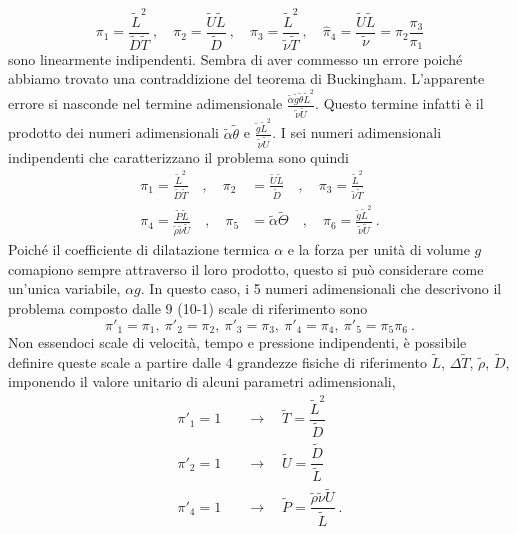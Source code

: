 \documentclass{article}
\begin{document}
\begin{equation}
    \pi_1 = \frac{\tilde{L}^2}{\tilde{D}\tilde{T}} \ , \quad
    \pi_2 = \frac{\tilde{U}\tilde{L}}{\tilde{D}} \ , \quad
    \pi_3 = \frac{\tilde{L}^2}{\tilde{\nu}\tilde{T}} \ , \quad 
    \hat{\pi}_4 = \frac{\tilde{U}\tilde{L}}{\tilde{\nu}} = \pi_2 \dfrac{\pi_3}{\pi_1}
\end{equation}
sono linearmente indipendenti. Sembra di aver commesso un errore poiché abbiamo trovato una contraddizione del teorema di Buckingham. L'apparente errore si nasconde nel termine adimensionale $\frac{\tilde{\alpha} \tilde{g} \tilde{\theta} \tilde{L}^2}{\tilde{\nu} \tilde{U}}$. Questo termine infatti è il prodotto dei numeri adimensionali $\tilde{\alpha} \tilde{\theta}$ e $\frac{\tilde{g} \tilde{L}^2}{\tilde{\nu} \tilde{U}}$.
I sei numeri adimensionali indipendenti che caratterizzano il problema sono quindi
\begin{equation}
\begin{aligned}
    \pi_1 = \frac{\tilde{L}^2}{\tilde{D}\tilde{T}} \quad ,\quad
    \pi_2 & = \frac{\tilde{U}\tilde{L}}{\tilde{D}} \quad ,\quad
    \pi_3 = \frac{\tilde{L}^2}{\tilde{\nu}\tilde{T}} \\
    \pi_4 = \frac{\tilde{P}\tilde{L}}{\tilde{\rho}\tilde{\nu}\tilde{U}} \quad ,\quad
    \pi_5 & = {\tilde{\alpha}\tilde{\Theta}} \quad ,\quad
    \pi_6 = \frac{\tilde{g} \tilde{L}^2}{\tilde{\nu} \tilde{U}} \ .
\end{aligned}
\end{equation}
%
Poiché il coefficiente di dilatazione termica $\alpha$ e la forza per unità di volume $g$ comapiono sempre attraverso il loro prodotto, questo si può considerare come un'unica variabile, $\alpha g$. In questo caso, i 5 numeri adimensionali che descrivono il problema composto dalle 9 (10-1) scale di riferimento sono
\begin{equation}
  \pi'_1 = \pi_1, \  \pi'_2 = \pi_2, \ \pi'_3 = \pi_3, \ \pi'_4 = \pi_4, \ \pi'_5 = \pi_5 \pi_6 \ .  
\end{equation}
%
Non essendoci scale di velocità, tempo e pressione indipendenti, è possibile definire queste scale a partire dalle 4 grandezze fisiche di riferimento $\tilde{L}$, $\Delta \tilde{T}$, $\tilde{\rho}$, $\tilde{D}$, imponendo il valore unitario di alcuni parametri adimensionali,
\begin{equation}
    \begin{aligned}
      \pi'_1 = 1 & \quad \rightarrow \quad \tilde{T} = \dfrac{\tilde{L}^2}{\tilde{D}} \\
      \pi'_2 = 1 & \quad \rightarrow \quad \tilde{U} = \dfrac{\tilde{D}}{\tilde{L}} \\
      \pi'_4 = 1 & \quad \rightarrow \quad \tilde{P} = \dfrac{\tilde{\rho}\tilde{\nu}\tilde{U}}{\tilde{L}} \ .
    \end{aligned}
\end{equation}
\end{document}
